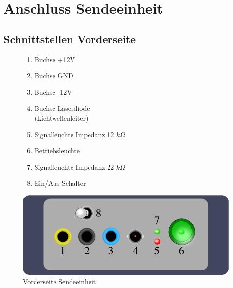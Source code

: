 \documentclass[10pt,a4paper]{scrartcl}
\begin{document}
\section{Anschluss Sendeeinheit}
\subsection{Schnittstellen Vorderseite}
\begin{figure}[H]
\begin{minipage}[t]{6cm}
\vspace{0pt}

\begin{enumerate}
\item Buchse +12V
\item Buchse GND
\item Buchse -12V
\item Buchse Laserdiode \\(Lichtwellenleiter)
\item Signalleuchte Impedanz 12 $k\Omega$
\item Betriebsleuchte
\item Signalleuchte Impedanz 22 $k\Omega$
\item Ein/Aus Schalter 
\end{enumerate}
\end{minipage}
\hfill
\begin{minipage}[t]{6.5cm}
\vspace{0pt}
\centering
\includegraphics[scale=0.7]{gfx/tx-front.pdf}
\caption{Vorderseite Sendeeinheit}
\label{fig:tx-front}
\end{minipage}
\end{figure}
\end{document}
